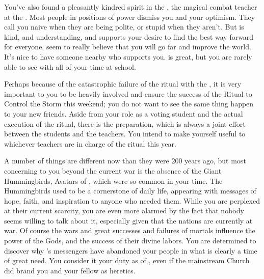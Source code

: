 \documentclass[char]{GL2020}
\begin{document}
You’ve also found a pleasantly kindred spirit in the \cInterpol{\full}, the magical combat teacher at the \pSc{}. Most people in positions of power dismiss you and your optimism. They call you naive when they are being polite, or stupid when they aren’t. But \cInterpol{} is kind, and understanding, and supports your desire to find the best way forward for everyone. \cInterpol{\They} seem\cInterpol{\verbs} to really believe that you will go far and improve the world. It’s nice to have someone nearby who supports you. \cWildCard{} is great, but you are rarely able to see \cWildCard{\them} with all of your time at school.

Perhaps because of the catastrophic failure of the ritual with the \cDisneySect{}, it is very important to you to be heavily involved and ensure the success of the Ritual to Control the Storm this weekend; you do not want to see the same thing happen to your new friends. Aside from your role as a voting student and the actual execution of the ritual, there is the preparation, which is always a joint effort between the students and the teachers. You intend to make yourself useful to whichever teachers are in charge of the ritual this year.

A number of things are different now than they were 200 years ago, but most concerning to you beyond the current war is the absence of the Giant Hummingbirds, Avatars of \cFarmGod{}, which were so common in your time. The Hummingbirds used to be a cornerstone of daily life, appearing with messages of hope, faith, and inspiration to anyone who needed them. While you are perplexed at their current scarcity, you are even more alarmed by the fact that nobody seems willing to talk about it, especially given that the nations are currently at war. Of course the wars and great successes and failures of mortals influence the power of the Gods, and the success of their divine labors. You are determined to discover why \cFarmGod{}'s messengers have abandoned your people in what is clearly a time of great need. You consider it your duty as \cDisney{\cleric} of \cFarmGod{}, even if the mainstream Church did brand you and your fellow \cDisneySect{} as heretics.
\end{document}

